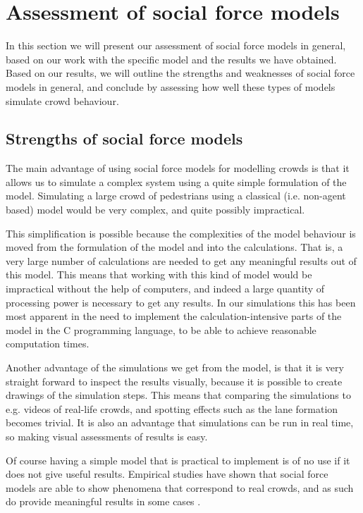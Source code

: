 \section{Assessment of social force models}
\label{sec:assessment}
In this section we will present our assessment of social force models in 
general, based on our work with the specific model and the results we have 
obtained. Based on our results, we will outline the strengths and weaknesses 
of social force models in general, and conclude by assessing how well these 
types of models simulate crowd behaviour.

\subsection{Strengths of social force models}
The main advantage of using social force models for modelling crowds is that 
it allows us to simulate a complex system using a quite simple formulation of 
the model. Simulating a large crowd of pedestrians using a classical (i.e. 
non-agent based) model would be very complex, and quite possibly impractical.

This simplification is possible because the complexities of the model 
behaviour is moved from the formulation of the model and into the 
calculations. That is, a very large number of calculations are needed to get 
any meaningful results out of this model. This means that working with this 
kind of model would be impractical without the help of computers, and indeed a 
large quantity of processing power is necessary to get any results. In our 
simulations this has been most apparent in the need to implement the 
calculation-intensive parts of the model in the C programming language, to be 
able to achieve reasonable computation times.

Another advantage of the simulations we get from the model, is that it is very 
straight forward to inspect the results visually, because it is possible to 
create drawings of the simulation steps. This means that comparing the 
simulations to e.g. videos of real-life crowds, and spotting effects such as 
the lane formation becomes trivial. It is also an advantage that simulations 
can be run in real time, so making visual assessments of results is easy.

Of course having a simple model that is practical to implement is of no use if 
it does not give useful results. Empirical studies have shown that social 
force models are able to show phenomena that correspond to real crowds, and as 
such do provide meaningful results in some cases \cite{self-org,HelbingNew}. 

